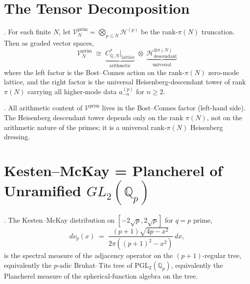 \section{The Tensor Decomposition}
\label{v4-arith:cs:tensor-decomposition}

\begin{theorem}
\label{v4-arith:thm:BC-tensor-placement}
\ClaimStatusProvedHere. For each finite \(N\), let
\(\mathcal{V}^{\mathrm{prim}}_{N}=\bigotimes_{p\leq N}\mathcal{H}^{(p)}\)
be the rank-\(\pi(N)\) truncation. Then as graded vector spaces,
\begin{equation}
\mathcal{V}^{\mathrm{prim}}_{N}\;\cong\;
\underbrace{C_{\mathbb{Q},N}^{*}\bigr|_{\mathrm{lattice}}}_{\text{arithmetic}}
\;\otimes\;
\underbrace{\mathcal{H}^{\otimes\pi(N)}_{\mathrm{descendant}}}_{\text{universal}}
\end{equation}
where the left factor is the Bost--Connes action on the rank-\(\pi(N)\)
zero-mode lattice, and the right factor is the universal
Heisenberg-descendant tower of rank \(\pi(N)\) carrying all
higher-mode data \(a^{(p)}_{-n}\) for \(n\geq 2\).
\end{theorem}

\begin{corollary}
\label{v4-arith:cor:arithmetic-content-on-lattice}
\ClaimStatusProvedHere. All arithmetic content of
\(\mathcal{V}^{\mathrm{prim}}\) lives in the Bost--Connes factor
(left-hand side). The Heisenberg descendant tower depends only on
the rank \(\pi(N)\), not on the arithmetic nature of the primes; it
is a universal rank-\(\pi(N)\) Heisenberg dressing.
\end{corollary}

\section{Kesten--McKay = Plancherel of Unramified \(GL_{2}(\mathbb{Q}_{p})\)}
\label{v4-arith:cs:kesten-mckay-plancherel}

\begin{theorem}
\label{v4-arith:thm:kesten-mckay-plancherel}
\ClaimStatusProvedElsewhere. The Kesten--McKay distribution on
\([-2\sqrt{p},2\sqrt{p}]\) for \(q=p\) prime,
\begin{equation}
d\nu_{p}(x)\;=\;\frac{(p+1)\sqrt{4p-x^{2}}}{2\pi((p+1)^{2}-x^{2})}\,dx,
\end{equation}
is the spectral measure of the adjacency operator on the
\((p+1)\)-regular tree, equivalently the \(p\)-adic Bruhat--Tits tree
of \(\mathrm{PGL}_{2}(\mathbb{Q}_{p})\), equivalently the Plancherel
measure of the spherical-function algebra on the tree.
\end{theorem}

